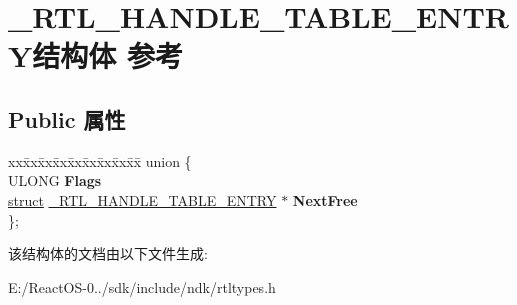 \hypertarget{struct___r_t_l___h_a_n_d_l_e___t_a_b_l_e___e_n_t_r_y}{}\section{\+\_\+\+R\+T\+L\+\_\+\+H\+A\+N\+D\+L\+E\+\_\+\+T\+A\+B\+L\+E\+\_\+\+E\+N\+T\+R\+Y结构体 参考}
\label{struct___r_t_l___h_a_n_d_l_e___t_a_b_l_e___e_n_t_r_y}
\subsection*{Public 属性}
\begin{DoxyCompactItemize}
\item 
\mbox{\label{struct___r_t_l___h_a_n_d_l_e___t_a_b_l_e___e_n_t_r_y_a413fc14b9ae74508da47defffa92aecd}} 
\begin{tabbing}
xx\=xx\=xx\=xx\=xx\=xx\=xx\=xx\=xx\=\kill
union \{\\
\>ULONG {\bfseries Flags}\\
\>\hyperlink{interfacestruct}{struct} \hyperlink{struct___r_t_l___h_a_n_d_l_e___t_a_b_l_e___e_n_t_r_y}{\_RTL\_HANDLE\_TABLE\_ENTRY} $\ast$ {\bfseries NextFree}\\
\}; \\

\end{tabbing}\end{DoxyCompactItemize}


该结构体的文档由以下文件生成\+:\begin{DoxyCompactItemize}
\item 
E\+:/\+React\+O\+S-\/0../sdk/include/ndk/rtltypes.\+h\end{DoxyCompactItemize}
